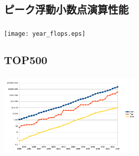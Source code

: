 \documentclass{beamer}  %
\theoremstyle{example}
\begin{document}
\subsection{ピーク浮動小数点演算性能}          
\begin{frame}\frametitle{\insertsubsection}
\begin{center}
\texttt{[image: year\_flops.eps]}
\end{center}
\end{frame}

\subsection{TOP500}          
\begin{frame}\frametitle{\insertsubsection}
\begin{center}
\includegraphics[width=7cm]{top500.png}
\end{center}
\end{frame}
\end{document}
